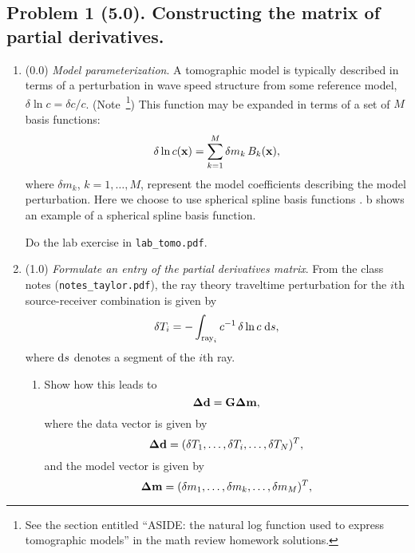 \documentclass[11pt,titlepage,fleqn]{article}
\begin{document}

\subsection*{Problem 1 (5.0). Constructing the matrix of partial derivatives.}

\begin{enumerate}
\item (0.0) {\em Model parameterization}. A tomographic model is typically described in terms of a perturbation in wave speed structure from some reference model, \ie $\delta\ln c = \delta c/c$.
(Note~\footnote{See the section entitled ``ASIDE: the natural log function used to express tomographic models'' in the math review homework solutions.})
This function may be expanded in terms of a set of $M$ basis functions:
%
\begin{equation}
\delta\ln c(\mbox{${\bf x}$})=\sum_{k=1}^M \delta m_k\,B_k(\mbox{${\bf x}$}),
\label{dlnv}
\end{equation}
%
where $\delta m_k$, $k=1,\ldots,M$, represent the model coefficients describing the model perturbation.  Here we choose to use spherical spline basis functions \citep{WangDahlen1995spline,Wang1998}.
b shows an example of a spherical spline basis function.

Do the lab exercise in \verb+lab_tomo.pdf+.


\item (1.0) {\em Formulate an entry of the partial derivatives matrix}.
%
From the class notes (\verb+notes_taylor.pdf+), the ray theory traveltime perturbation for the $i$th source-receiver combination is given by
%
\begin{equation}
\delta T_i = -\int_{\mathrm{ray}_i} c^{-1}\,\delta\ln c\;\mathrm{d} s,
\label{ray_tomography}
\end{equation}
%
where $\mathrm{d} s$ denotes a segment of the $i$th ray.

\begin{enumerate}
\item Show how this leads to 
%
\begin{equation}
\mbox{\boldmath $\bf \Delta$}\mbox{${\bf d}$} = \mbox{${\bf G}$}\mbox{\boldmath $\bf \Delta$}\mbox{${\bf m}$},
\end{equation}
%
where the data vector is given by
%
\begin{equation}
\mbox{\boldmath $\bf \Delta$}\mbox{${\bf d}$} = (\delta T_1,\ldots,\delta T_i,\ldots,\delta T_N)^T,
\label{d}
\end{equation}
%
and the model vector is given by
%
\begin{equation}
\mbox{\boldmath $\bf \Delta$}\mbox{${\bf m}$} = (\delta m_1,\ldots,\delta m_k,\ldots,\delta m_M)^T,
\label{m}
\end{equation}


\end{enumerate}
\end{enumerate}
\end{document}
